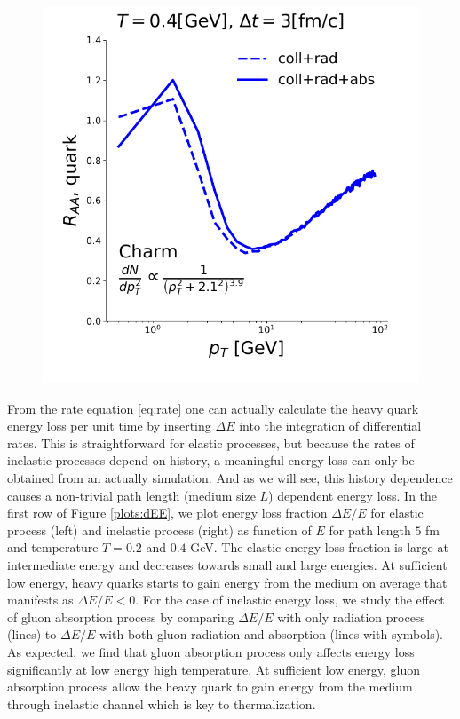 \documentclass[aps, prc, reprint, amsmath, groupedaddress, nofootinbib]{revtex4-1}
\begin{document}
\begin{figure}
\includegraphics[width=\columnwidth]{BoxRaa.pdf}
\caption{}\label{plots:BoxRaa}
\end{figure}
From the rate equation \ref{eq:rate} one can actually calculate the heavy quark energy loss per unit time by inserting $\Delta E$ into the integration of differential rates.
This is straightforward for elastic processes, but because the rates of inelastic processes depend on history, a meaningful energy loss can only be obtained from an actually simulation.
And as we will see, this history dependence causes a non-trivial path length (medium size $L$) dependent energy loss.
In the first row of Figure \ref{plots:dEE}, we plot energy loss fraction $\Delta E/E$ for elastic process (left) and inelastic process (right) as function of $E$ for path length $5$ fm and temperature $T=0.2$ and $0.4$  GeV.
The elastic energy loss fraction is large at intermediate energy and decreases towards small and large energies.
At sufficient low energy, heavy quarks starts to gain energy from the medium on average that manifests as $\Delta E/E < 0$.
For the case of inelastic energy loss, we study the effect of gluon absorption process by comparing $\Delta E/E$ with only radiation process (lines) to $\Delta E/E$ with both gluon radiation and absorption (lines with symbols).
As expected, we find that gluon absorption process only affects energy loss significantly at low energy high temperature.
At sufficient low energy, gluon absorption process allow the heavy quark to gain energy from the medium through inelastic channel which is key to thermalization.
\end{document}
